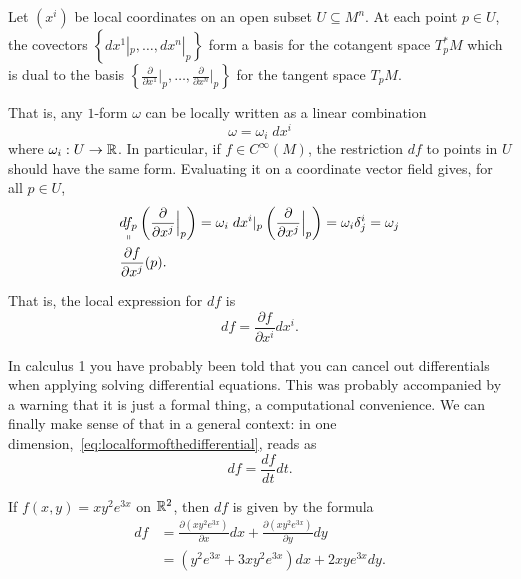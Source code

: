 \begin{proposition}
  Let $(x^i)$ be local coordinates on an open subset $U\subseteq M^n$.
  At each point $p\in U$, the covectors $\left\{dx^1|_p, \ldots, dx^n|_p\right\}$ form a basis for the cotangent space $T_p^* M$ which is dual to the basis $\left\{\frac{\partial}{\partial x^1}\Big|_p, \ldots, \frac{\partial}{\partial x^n}\Big|_p\right\}$ for the tangent space $T_p M$.
\end{proposition}

That is, any $1$-form $\omega$ can be locally written as a linear combination
\begin{equation}
  \omega = \omega_i\; dx^i
\end{equation}
where $\omega_i:U\to\mathbb{R}$.
In particular, if $f\in C^\infty(M)$, the restriction $df$ to points in $U$ should have the same form.
Evaluating it on a coordinate vector field gives, for all $p\in U$,
\begin{align}
   & \underset{\shortparallel}{df_p} \left(\frac{\partial}{\partial x^j}\Big|_p\right)
  = \omega_i\; dx^i|_p \left(\frac{\partial}{\partial x^j}\Big|_p\right) =
  \omega_i \delta^i_j = \omega_j                                                       \\
   & \frac{\partial f}{\partial x^j}(p).
\end{align}

That is, the local expression for $df$ is
\begin{equation}\label{eq:localformofthedifferential}
  df =  \frac{\partial f}{\partial x^i} dx^i.
\end{equation}

\begin{remark}
  In calculus 1 you have probably been told that you can cancel out differentials when applying solving differential equations.
  This was probably accompanied by a warning that it is just a formal thing, a computational convenience.
  We can finally make sense of that in a general context: in one dimension,~\eqref{eq:localformofthedifferential}, reads as
  \begin{equation}
    d f = \frac{df}{dt}dt.
  \end{equation}
\end{remark}

\begin{example}\label{ex:diff1}
  If $f(x,y) = x y^2 e^{3x}$ on $\mathbb{R}^2$, then $df$ is given by the formula
  \begin{align}
    df
     & = \frac{\partial (x y^2 e^{3x})}{\partial x} dx + \frac{\partial (x y^2 e^{3x})}{\partial y} dy \\
     & = (y^2 e^{3x} +3xy^2 e^{3x}) dx + 2xy e^{3x} dy.
  \end{align}
\end{example}

